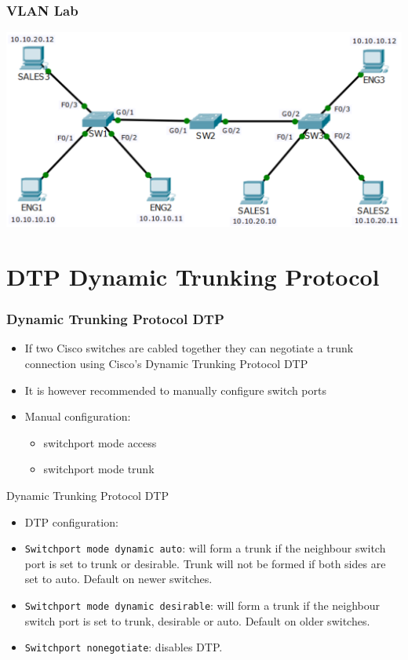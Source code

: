 \documentclass[pdflatex,compress,mathserif]{beamer}
\begin{document}
\begin{frame}
	\frametitle{VLAN Lab}
	\begin{center}
		\includegraphics[width=\linewidth]{img/img32}
	\end{center}
\end{frame}

\section{DTP Dynamic Trunking Protocol}

\begin{frame}
	\frametitle{Dynamic Trunking Protocol DTP}
	\begin{itemize}
		\item If two Cisco switches are cabled together they can negotiate a trunk
connection using Cisco’s Dynamic Trunking Protocol DTP
		\item It is however recommended to manually configure switch ports
		\item Manual configuration:
		\begin{itemize}
			\item switchport mode access
			\item switchport mode trunk
		\end{itemize}
	\end{itemize}
\end{frame}

\begin{frame}{Dynamic Trunking Protocol DTP}
	\begin{itemize}
		\item DTP configuration:
		\item \texttt{Switchport mode dynamic auto}: will form a trunk if the
neighbour switch port is set to trunk or desirable. Trunk will not be
formed if both sides are set to auto. Default on newer switches.
		\item \texttt{Switchport mode dynamic desirable}: will form a trunk if
the neighbour switch port is set to trunk, desirable or auto. Default on
older switches.
		\item \texttt{Switchport nonegotiate}: disables DTP.
	\end{itemize}
\end{frame}
\end{document}
